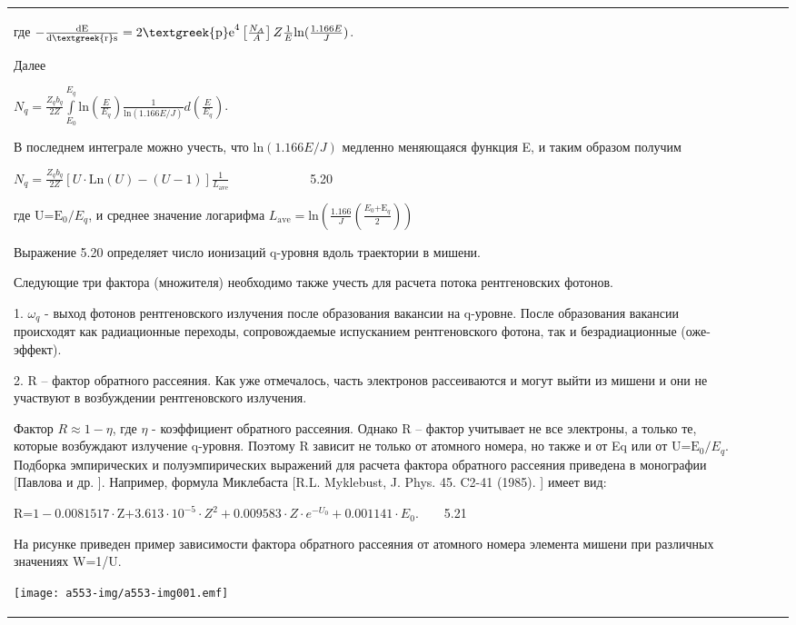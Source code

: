 \documentclass[a4paper,14pt, openany, twoside, draft]{extbook} %
\begin{document}
\begin{flushleft}
\begin{supertabular}{|m{1.7279999cm}|m{1.522cm}|m{1.522cm}|m{1.522cm}|m{1.744cm}|}
где  $-\frac{{\text{dE}}}{{\text{d\textgreek{r}s}}}=2{\text{\textgreek{p}e}}^4\left[\frac{N_A} A\right]Z\frac 1 E\text{ln}(\frac{1.166E} J)$.

Далее

 $N_q=\frac{Z_qb_q}{2Z}\overset{E_q}{\underset{E_0}{\int }}\text{ln}(\frac E{E_q})\frac 1{\text{ln}(1.166E/J)}d(\frac E{E_q})$.

В последнем интеграле можно учесть, что  $\text{ln}(1.166E/J)$ медленно меняющаяся функция E, и таким образом получим

 $N_q=\frac{Z_qb_q}{2Z}\left[U\cdot {\text{Ln}}(U)-(U-1)\right]\frac 1{L_{{\text{ave}}}}$ \ \ \ \ \ \ \ \ \ \ \ \ 5.20

где  ${\text{U=E}}_0/E_q$, и среднее значение логарифма  $L_{{\text{ave}}}=\text{ln}(\frac{1.166} J(\frac{E_0{\text{+E}}_q} 2))$

Выражение 5.20 определяет число ионизаций q{}-уровня вдоль траектории в мишени.

Следующие три фактора (множителя) необходимо также учесть для расчета потока рентгеновских фотонов.

1.  $\omega _q$ - выход фотонов рентгеновского излучения после образования вакансии на q{}-уровне. После образования вакансии происходят как радиационные переходы, сопровождаемые испусканием рентгеновского фотона, так  и безрадиационные (оже-эффект).

2. R – фактор обратного рассеяния. Как уже отмечалось, часть электронов рассеиваются и могут выйти из мишени и они не участвуют в возбуждении рентгеновского излучения.

Фактор  $R\approx 1-\eta $, где  $\eta $ - коэффициент обратного рассеяния. Однако R – фактор учитывает не все электроны, а только те, которые возбуждают излучение q{}-уровня. Поэтому R зависит не только от атомного номера, но также и от Eq или от  ${\text{U=E}}_0/E_q$. Подборка эмпирических и полуэмпирических выражений для расчета фактора  обратного рассеяния приведена в монографии [Павлова и др. ]. Например, формула Миклебаста [R.L. Myklebust, J. Phys. 45. C2-41 (1985). ] имеет вид:

 ${\text{R=}}1-0.0081517\cdot {\text{Z+}}3.613\cdot 10^{-5}\cdot Z^2+0.009583\cdot Z\cdot e^{-U_0}+0.001141\cdot E_0$.\ \ \ \ 5.21

На рисунке приведен пример зависимости фактора обратного рассеяния от атомного номера элемента мишени при различных значениях W=1/U.

 \texttt{[image: a553-img/a553-img001.emf]}


\end{supertabular}
\end{flushleft}
\end{document}
